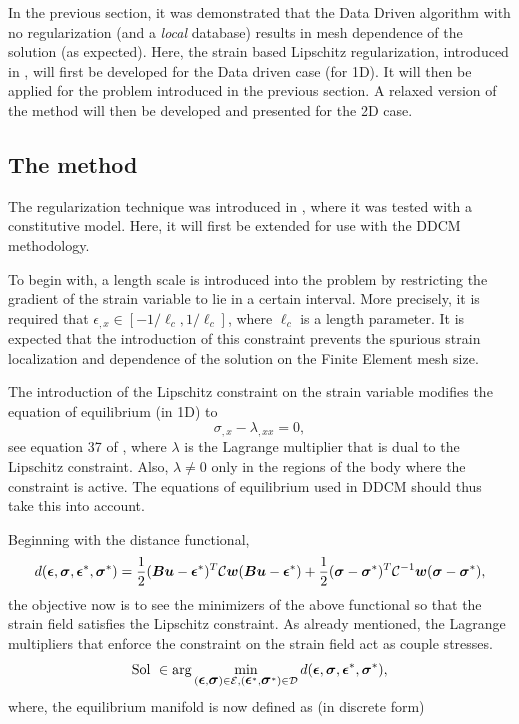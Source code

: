 \documentclass[11pt]{elsarticle}
\begin{document}
In the previous section, it was demonstrated that the Data Driven algorithm with no regularization (and a \textit{local} database) results in mesh dependence of the solution (as expected). Here, the strain based Lipschitz regularization, introduced in \cite{Kamasamudram}, will first be developed for the Data driven case (for 1D). It will then be applied for the problem introduced in the previous section. A relaxed version of the method will then be developed and presented for the 2D case.

\subsection{The method}
The regularization technique was introduced in \cite{mylipsc}, where it was tested with a constitutive model. Here, it will first be extended for use with the DDCM methodology.

To begin with, a length scale is introduced into the problem by restricting the gradient of the strain variable to lie in a certain interval. More precisely, it is required that $\epsilon_{,x} \in [-1/{\ell_c}, 1/{\ell_c} ]$, where $\ell_c$ is a length parameter. It is expected that the introduction of this constraint prevents the spurious strain localization and dependence of the solution on the Finite Element mesh size. 


The introduction of the Lipschitz constraint on the strain variable modifies the equation of equilibrium (in 1D) to 
\begin{equation}
	\sigma_{,x}- \lambda_{,xx}=0,\label{equil_couple_1D}
\end{equation}
see equation 37 of \cite{Kamasamudram2023s}, where $\lambda$ is the Lagrange multiplier that is dual to the Lipschitz constraint. Also, $\lambda \neq 0$ only in the regions of the body where the constraint is active. The equations of equilibrium used in DDCM should thus take this into account. 

Beginning with the distance functional,
\begin{equation}
	d(\mbox{\boldmath $\epsilon$},\mbox{\boldmath $\sigma$},\mbox{\boldmath $\epsilon$}^*,\mbox{\boldmath $\sigma$}^*) = \frac{1}{2}(\mbox{\boldmath $B$} \mbox{\boldmath $u$} - \mbox{\boldmath $\epsilon$}^*)^T\mathcal{C}\mbox{\boldmath $w$}(\mbox{\boldmath $B$} \mbox{\boldmath $u$} - \mbox{\boldmath $\epsilon$}^*) + \frac{1}{2}(\mbox{\boldmath $\sigma$} - \mbox{\boldmath $\sigma$}^*)^T\mathcal{C}^{-1}\mbox{\boldmath $w$}(\mbox{\boldmath $\sigma$} - \mbox{\boldmath $\sigma$}^*),
\end{equation}
the objective now is to see the minimizers of the above functional so that the strain field satisfies the Lipschitz constraint. As already mentioned, the Lagrange multipliers that enforce the constraint on the strain field act as couple stresses.
\begin{equation}
	\text{Sol } \in \arg \min_{(\mbox{\boldmath $\epsilon$},\mbox{\boldmath $\sigma$}) \in \mathcal{E}, (\mbox{\boldmath $\epsilon$}^*,\mbox{\boldmath $\sigma$}^*) \in \mathcal{D}} d(\mbox{\boldmath $\epsilon$},\mbox{\boldmath $\sigma$},\mbox{\boldmath $\epsilon$}^*,\mbox{\boldmath $\sigma$}^*),
\end{equation}
where, the equilibrium manifold is now defined as (in discrete form)
 
\end{document}
